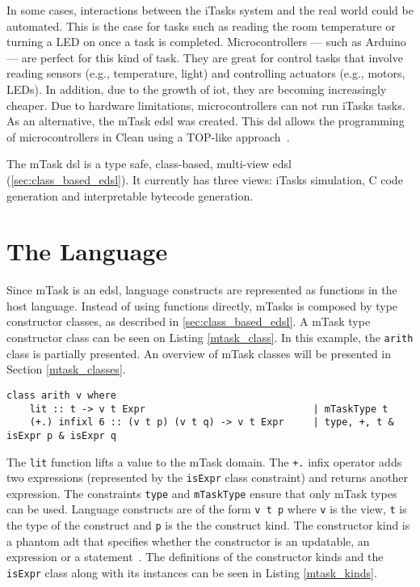 In some cases, interactions between the iTasks system and the real world could be automated. This is the case for tasks such as reading the room temperature or turning a LED on once a task is completed. Microcontrollers --- such as Arduino --- are perfect for this kind of task. They are great for control tasks that involve reading sensors (e.g., temperature, light) and controlling actuators (e.g., motors, LEDs). In addition, due to the growth of \ac{iot}, they are becoming increasingly cheaper. Due to hardware limitations, microcontrollers can not run iTasks tasks. As an alternative, the mTask \ac{edsl} was created. This \ac{dsl} allows the programming of microcontrollers in Clean using a TOP-like approach~\cite{clean,mtasks,mtasks2,martthesis}.

The mTask \ac{dsl} is a type safe, class-based, multi-view \ac{edsl} (\autoref{sec:class_based_edsl}). It currently has three views: iTasks simulation, C code generation and interpretable bytecode generation.

\section{The Language}
Since mTask is an \ac{edsl}, language constructs are represented as functions in the host language. Instead of using functions directly, mTasks is composed by type constructor classes, as described in \autoref{sec:class_based_edsl}. A mTask type constructor class can be seen on Listing \ref{mtask_class}. In this example, the \texttt{arith} class is partially presented. An overview of mTask classes will be presented in Section \ref{mtask_classes}.

\begin{lstlisting}[caption=A mTask class,captionpos=b,label=mtask_class]
class arith v where
    lit :: t -> v t Expr                             | mTaskType t                       
    (+.) infixl 6 :: (v t p) (v t q) -> v t Expr     | type, +, t & isExpr p & isExpr q
\end{lstlisting}

The \texttt{lit} function lifts a value to the mTask domain. The \texttt{+.} infix operator adds two expressions (represented by the \texttt{isExpr} class constraint) and returns another expression. The constraints \texttt{type} and \texttt{mTaskType} ensure that only mTask types can be used. Language constructs are of the form \texttt{v t p} where \texttt{v} is the view, \texttt{t} is the type of the construct and \texttt{p} is the the construct kind. The constructor kind is a phantom \ac{adt} that specifies whether the constructor is an updatable, an expression or a statement~\cite{mtasks2}. The definitions of the constructor kinds and the \texttt{isExpr} class along with its instances can be seen in Listing \ref{mtask_kinds}.

